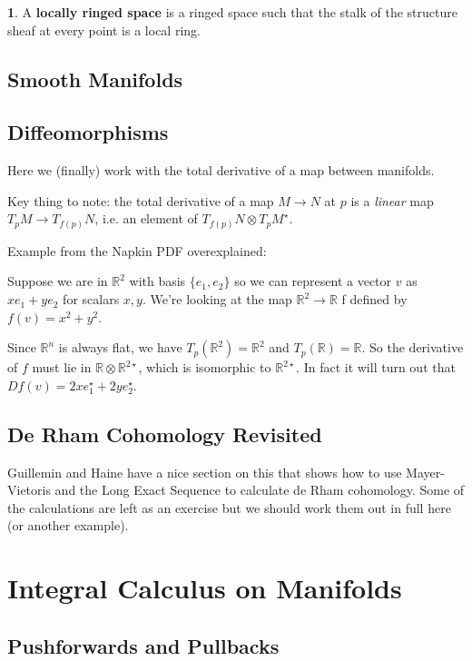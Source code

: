 \documentclass[oneside,english]{amsbook}
\numberwithin{section}{chapter}
\theoremstyle{plain}
\theoremstyle{definition}
\newtheorem{defn}[thm]{\protect\definitionname}
\providecommand{\definitionname}{Definition}
\begin{document}
			\begin{defn} 
				A \textbf{locally ringed space} is a ringed space such that the stalk of the structure sheaf at every point is a local ring.
			\end{defn}

		\section{Smooth Manifolds}

		\section{Diffeomorphisms}
		
			Here we (finally) work with the total derivative of a map between manifolds.
		
			Key thing to note: the total derivative of a map $M\to N$ at $p$ is a \emph{linear} map $T_pM\to T_{f(p)}N$, i.e. an element of $T_{f(p)}N\otimes T_pM^\star$. 
	
			Example from the Napkin PDF overexplained: 
			
			Suppose we are in $\mathbb{R}^2$ with basis $\{e_1, e_2\}$ so we can represent a vector $v$ as $xe_1 + ye_2$ for scalars $x, y$. We're looking at the map $\mathbb{R}^2\to \mathbb{R}$ f defined by $f(v) = x^2 + y^2$. 
			
			Since $\mathbb{R}^n$ is always flat, we have $T_p(\mathbb{R}^2) = \mathbb{R}^2$ and $T_p(\mathbb{R}) = \mathbb{R}$. So the derivative of $f$ must lie in $\mathbb{R}\otimes \mathbb{R}^{2\star}$, which is isomorphic to $\mathbb{R}^{2\star}$. In fact it will turn out that $Df(v) = 2xe_1^\star + 2ye_2^\star$.


		\section{De Rham Cohomology Revisited}
		
			Guillemin and Haine have a nice section on this that shows how to use Mayer-Vietoris and the Long Exact Sequence to calculate de Rham cohomology. Some of the calculations are left as an exercise but we should work them out in full here (or another example).


	\chapter{Integral Calculus on Manifolds}

		\section{Pushforwards and Pullbacks}
\end{document}
